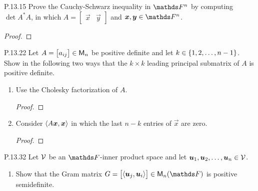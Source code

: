 \documentclass{../homework}
\date{Tuesday 4/30}
\author{}
\begin{document}
\begin{problems}
\item[P.13.15] Prove the Cauchy-Schwarz inequality in \(\FF^n\) by
  computing \(\det A^* A\), in which
  \(A = \begin{bmatrix} \vec x & \vec y \end{bmatrix}\) and
  \(\vec x, \vec y \in \FF^n\).

  \begin{solution}
    \begin{proof}

    \end{proof}
  \end{solution}

\item[P.13.22] Let
  \(A = \begin{bmatrix} a_{ij} \end{bmatrix} \in \mathsf{M}_n\) be positive
  definite and let \(k \in \{ {1, 2, \dots, n-1} \}\).  Show in the
  following two ways that the \(k \times k\) leading principal
  submatrix of \(A\) is positive definite.

  \begin{enumerate}
  \item Use the Cholesky factorization of \(A\).

    \begin{solution}
      \begin{proof}

      \end{proof}
    \end{solution}

  \item Consider \(\inner{A \vec x, \vec x}\) in which the last
    \(n - k\) entries of \(\vec x\) are zero.

    \begin{solution}
      \begin{proof}

      \end{proof}
    \end{solution}
  \end{enumerate}

\item[P.13.32] Let \(\mathcal{V}\) be an \(\FF\)-inner product space and
  let \(\vec u_1, \vec u_2, \dots, \vec u_n \in \Vspace\).

  \begin{enumerate}
  \item Show that the Gram matrix
    \(G = \begin{bmatrix} \inner{\vec u_j, \vec u_i} \end{bmatrix} \in
    \M_n(\FF)\) is positive semidefinite.


\end{enumerate}
\end{problems}
\end{document}
